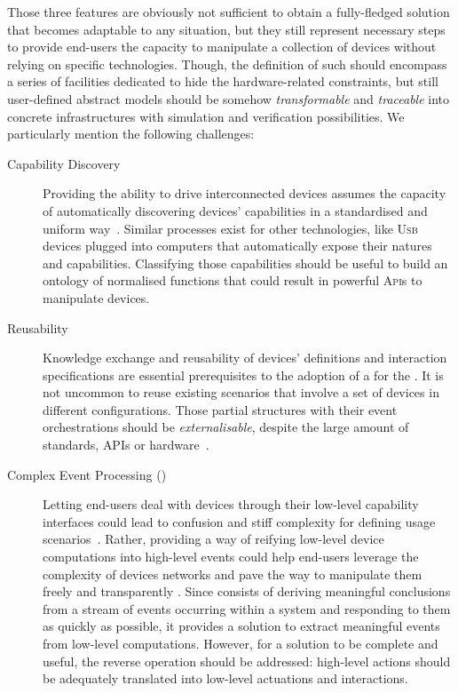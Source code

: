 Those three features are obviously not sufficient to obtain a fully-fledged solution that becomes adaptable to any situation, but they still represent necessary steps to provide end-users the capacity to manipulate a collection of devices without relying on specific technologies. Though, the definition of such \DSLS should encompass a series of facilities dedicated to hide the hardware-related constraints, but still user-defined abstract models should be somehow \textit{transformable} and \textit{traceable} into concrete infrastructures with simulation and verification possibilities. We particularly mention the following challenges:

\begin{description}
	\item[Capability Discovery] Providing the ability to drive interconnected devices assumes the capacity of automatically discovering devices' capabilities in a standardised and uniform way~\cite{chaqfeh-12}. Similar processes exist for other technologies, like \textsc{Usb} devices plugged into computers that automatically expose their natures and capabilities. Classifying those capabilities should be useful to build an ontology of normalised functions that could result in powerful \textsc{Api}s to manipulate devices. 
	
	\item[Reusability] Knowledge exchange and reusability of devices' definitions and interaction specifications are essential prerequisites to the adoption of a \DSL for the \IOT. It is not uncommon to reuse existing scenarios that involve a set of devices in different configurations. Those partial \IOT structures with their event orchestrations should be \textit{externalisable}, despite the large amount of standards, \textsc{API}s or hardware~\cite{ma-14}.

	\item[Complex Event Processing (\CEP)] Letting end-users deal with devices through their low-level capability interfaces could lead to confusion and stiff complexity for defining usage scenarios~\cite{ma-13}. Rather, providing a way of reifying low-level device computations into high-level events could help end-users leverage the complexity of devices networks and pave the way to manipulate them freely and transparently \cite{cugola-12}. Since \CEP consists of deriving meaningful conclusions from a stream of events occurring within a system and responding to them as quickly as possible, it provides a solution to extract meaningful events from low-level computations. However, for a solution to be complete and useful, the reverse operation should be addressed: high-level actions should be adequately translated into low-level actuations and interactions.
	

\end{description}
